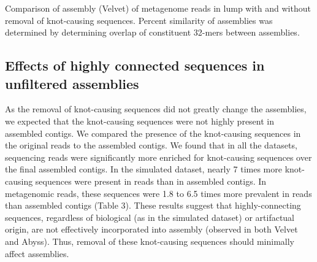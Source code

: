 \documentclass[11pt]{article} %
\begin{document}
\begin{table}
\caption{Comparison of assembly (Velvet) of metagenome reads in lump with and without removal of knot-causing sequences.  Percent similarity of assemblies was determined by determining overlap of constituent 32-mers between assemblies.}
\end{table}

\subsection{Effects of highly connected sequences in unfiltered assemblies}
As the removal of knot-causing sequences did not greatly change the assemblies, we expected that the knot-causing sequences were not highly present in assembled contigs.  We compared the presence of the knot-causing sequences in the original reads to the assembled contigs.  We found that in all the datasets, sequencing reads were significantly more enriched for knot-causing sequences over the final assembled contigs. In the simulated dataset, nearly 7 times more knot-causing sequences were present in reads than in assembled contigs. In metagenomic reads, these sequences were 1.8 to 6.5 times more prevalent in reads than assembled contigs (Table 3).  These results suggest that highly-connecting sequences, regardless of biological (as in the simulated dataset) or artifactual origin, are not effectively incorporated into assembly (observed in both Velvet and Abyss).  Thus, removal of these knot-causing sequences should minimally affect assemblies.  
\end{document}
